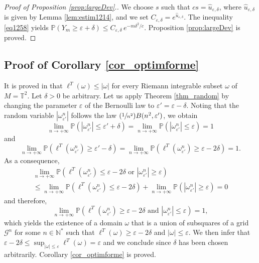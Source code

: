 \documentclass[10pt]{amsart}
\newcommand{\Psfrac}[2]{(\sfrac{#1}{#2})}
\def\N{\mathbb{N}}
\theoremstyle{definition}
\begin{document}
\begin{proof}[Proof of Proposition \ref{prop:largeDev}.]
We choose $s$ such that $cs=\hat u_{\varepsilon,\delta}$, where $\hat u_{\varepsilon,\delta}$ is given by Lemma \ref{lem:estim1214}, and we set $C_{\varepsilon, \delta}=e^{\hat u_{\varepsilon,\delta}}$. The inequality \eqref{eq1258} yields
$\mathbb{P}( Y_m \geq \varepsilon + \delta) \leq C_{\varepsilon,\delta} \, e^{- m \delta^2/c }$.
Proposition \ref{prop:largeDev} is proved.
\end{proof}

\subsection{Proof of Corollary \ref{cor_optimforme}}\label{sec_proof_cor_optimforme}
It is proved in \cite{HebrardHumbert} that $\ell^T(\omega)\leq |\omega|$ for every Riemann integrable subset $\omega$ of $M=\mathbb{T}^2$. Let $\delta>0$ be arbitrary. Let us apply Theorem \ref{thm_random} by changing the parameter $\varepsilon$ of the Bernoulli law to $\varepsilon'=\varepsilon-\delta$. Noting that the random variable $|\omega_{\varepsilon'}^n|$ follows the law $\Psfrac{1}{n^2}B(n^2,\varepsilon')$, we obtain
\[
\lim_{n\to +\infty}\mathbb{P}(|\omega_{\varepsilon'}^n|\leq \varepsilon'+\delta)=\lim_{n\to +\infty}\mathbb{P}(|\omega_{\varepsilon'}^n|\leq \varepsilon)=1
\]
and
\[
\lim_{n\to +\infty}\mathbb{P}(\ell^T(\omega_{\varepsilon'}^n)\geq \varepsilon'-\delta)=\lim_{n\to +\infty}\mathbb{P}(\ell^T(\omega_{\varepsilon'}^n)\geq \varepsilon-2\delta)=1.
\]
As a consequence,
\begin{multline*}
\lim_{n\to +\infty}\mathbb{P}(\ell^T(\omega_{\varepsilon'}^n)\leq \varepsilon-2\delta\text{ or }|\omega_{\varepsilon'}^n|\geq \varepsilon) \\
\leq \lim_{n\to +\infty}\mathbb{P}(\ell^T(\omega_{\varepsilon'}^n)\leq \varepsilon-2\delta)+ \lim_{n\to +\infty}\mathbb{P}(|\omega_{\varepsilon'}^n|\geq \varepsilon)=0
\end{multline*}
and therefore,
\[
\lim_{n\to +\infty}\mathbb{P}\left(\ell^T(\omega_{\varepsilon'}^n)\geq \varepsilon-2\delta \text{ and } |\omega_{\varepsilon'}^n|\leq \varepsilon\right)=1,
\]
which yields the existence of a domain $\omega$ that is a union of subsquares of a grid~$\mathcal{G}^n$ for some $n\in \N^*$ such that $\ell^T(\omega)\geq \varepsilon-2\delta$ and $|\omega|\leq \varepsilon$. We then infer that $\varepsilon-2\delta\leq \sup_{|\omega| \leq \varepsilon} \ell^T(\omega)= \varepsilon$ and we conclude since $\delta$ has been chosen arbitrarily.
Corollary \ref{cor_optimforme} is proved.
\end{document}
